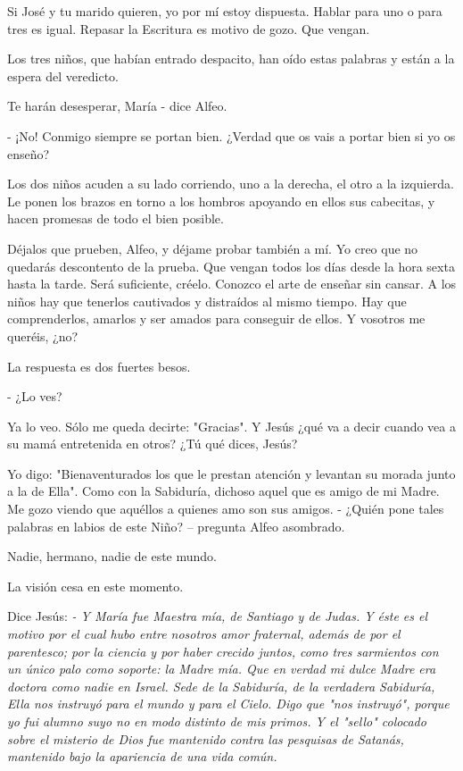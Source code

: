 \documentclass[12pt, twoside, openright]{book} %
\begin{document}
Si José y tu marido quieren, yo por mí estoy dispuesta. Hablar para uno o para tres es igual. Repasar la Escritura es motivo de gozo. Que vengan. 

Los tres niños, que habían entrado despacito, han oído estas palabras y están a la espera del veredicto. 

Te harán desesperar, María - dice Alfeo. 

- ¡No! Conmigo siempre se portan bien. ¿Verdad que os vais a portar bien si yo os enseño? 

Los dos niños acuden a su lado corriendo, uno a la derecha, el otro a la izquierda. Le ponen los brazos en torno a los hombros apoyando en ellos sus cabecitas, y hacen promesas de todo el bien posible. 

Déjalos que prueben, Alfeo, y déjame probar también a mí. Yo creo que no quedarás descontento de la prueba. Que vengan todos los días desde la hora sexta hasta la tarde. Será suficiente, créelo. Conozco el arte de enseñar sin cansar. A los niños hay que tenerlos cautivados y distraídos al mismo tiempo. Hay que comprenderlos, amarlos y ser amados para conseguir de ellos. Y vosotros me queréis, ¿no? 

La respuesta es dos fuertes besos. 

- ¿Lo ves? 

Ya lo veo. Sólo me queda decirte: "Gracias". Y Jesús ¿qué va a decir cuando vea a su mamá entretenida en otros? ¿Tú qué dices, Jesús? 

Yo digo: "Bienaventurados los que le prestan atención y levantan su morada junto a la de Ella". Como con la Sabiduría, dichoso aquel que es amigo de mi Madre. Me gozo viendo que aquéllos a quienes amo son sus amigos. - ¿Quién pone tales palabras en labios de este Niño? – pregunta Alfeo asombrado. 

Nadie, hermano, nadie de este mundo. 

La visión cesa en este momento. 

Dice Jesús: 
\emph{- Y María fue Maestra mía, de Santiago y de Judas. Y éste es el motivo por el cual hubo entre nosotros amor fraternal, además de por el parentesco; por la ciencia y por haber crecido juntos, como tres sarmientos con un único palo como soporte: la Madre mía. Que en verdad mi dulce Madre era doctora como nadie en Israel. Sede de la Sabiduría, de la verdadera Sabiduría, Ella nos instruyó para el mundo y para el Cielo. Digo que "nos instruyó", porque yo fui alumno suyo no en modo distinto de mis primos. Y el "sello" colocado sobre el misterio de Dios fue mantenido contra las pesquisas de Satanás, mantenido bajo la apariencia de una vida común.}
\end{document}

